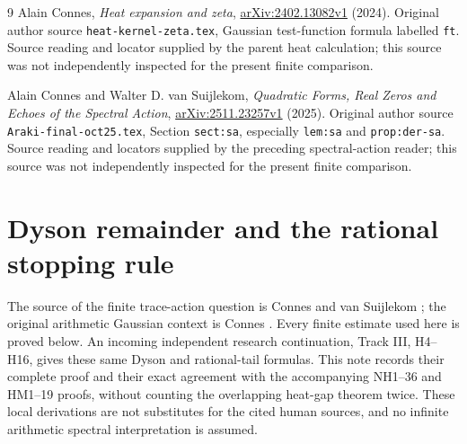 \begin{thebibliography}{9}
Alain Connes, \emph{Heat expansion and zeta},
\href{https://arxiv.org/abs/2402.13082v1}{arXiv:2402.13082v1} (2024).
Original author source \texttt{heat-kernel-zeta.tex}, Gaussian test-function
formula labelled \texttt{ft}. Source reading and locator supplied by the parent
heat calculation; this source was not independently inspected for the present
finite comparison.

Alain Connes and Walter D. van Suijlekom,
\emph{Quadratic Forms, Real Zeros and Echoes of the Spectral Action},
\href{https://arxiv.org/abs/2511.23257v1}{arXiv:2511.23257v1} (2025).
Original author source \texttt{Araki-final-oct25.tex},
Section \texttt{sect:sa}, especially \texttt{lem:sa} and
\texttt{prop:der-sa}. Source reading and locators supplied by the preceding
spectral-action reader; this source was not independently inspected for the
present finite comparison.
\end{thebibliography}

\endgroup

\clearpage\begingroup
\part*{Dyson remainder and the rational stopping rule}
\newcommand{\nhdtr}{\operatorname{tr}}
\newcommand{\nhdRea}{\operatorname{Re}}


The source of the finite trace-action question is Connes and van
Suijlekom \cite[Section on the spectral action]{nhd:CV}; the original
arithmetic Gaussian context is Connes \cite[Gaussian equation ft]{nhd:CH}.
Every finite estimate used here is proved below. An incoming independent
research continuation, Track III, H4--H16, gives these same Dyson and
rational-tail formulas. This note records their complete proof and their
exact agreement with the accompanying NH1--36 and HM1--19 proofs,
without counting the overlapping heat-gap theorem twice.
These local derivations are not substitutes for the cited human sources,
and no infinite arithmetic spectral interpretation is assumed.

